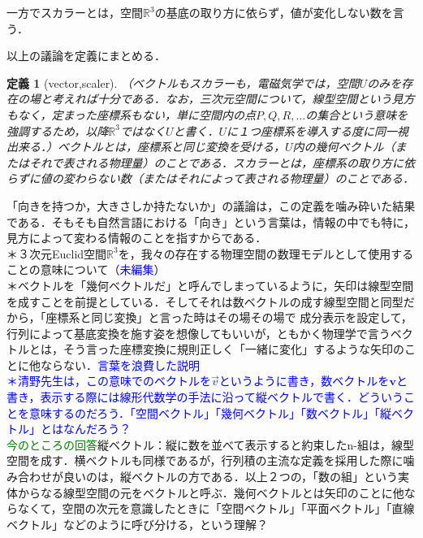 \documentclass[uplatex, 12pt, a4paper]{jsarticle}
\newtheorem{definition}{定義}
\begin{document}
一方でスカラーとは，空間$\mathbb{R}^3$の基底の取り方に依らず，値が変化しない数を言う．

以上の議論を定義にまとめる．\\
\begin{shadebox}
\begin{definition}[vector,scaler] \label{vector,scaler}
    （ベクトルもスカラーも，電磁気学では，空間$U$のみを存在の場と考えれば十分である．なお，三次元空間について，線型空間という見方もなく，定まった座標系もない，単に空間内の点$P,Q,R,\ldots$の集合という意味を強調するため，以降$\mathbb{R}^3$ではなく$U$と書く．$U$に１つ座標系を導入する度に同一視出来る．）ベクトルとは，座標系と同じ変換を受ける，$U$内の幾何ベクトル（またはそれで表される物理量）のことである．スカラーとは，座標系の取り方に依らずに値の変わらない数（またはそれによって表される物理量）のことである．
\end{definition}\end{shadebox}
「向きを持つか，大きさしか持たないか」の議論は，この定義を噛み砕いた結果である．そもそも自然言語における「向き」という言葉は，情報の中でも特に，見方によって変わる情報のことを指すからである．\\

\noindent
＊３次元Euclid空間$\mathbb{R}^3$を，我々の存在する物理空間の数理モデルとして使用することの意味について（\textcolor{blue}{未編集}）\\
＊ベクトルを「幾何ベクトルだ」と呼んでしまっているように，矢印は線型空間を成すことを前提としている．そしてそれは数ベクトルの成す線型空間と同型だから，「座標系と同じ変換」と言った時はその場その場で
成分表示を設定して，行列によって基底変換を施す姿を想像してもいいが，ともかく物理学で言うベクトルとは，そう言った座標変換に規則正しく「一緒に変化」するような矢印のことに他ならない．\textcolor{blue}{言葉を浪費した説明}\\
\textcolor{blue}{＊清野先生は，この意味でのベクトルを$\vec{v}$というように書き，数ベクトルを$\mathbf{v}$と書き，表示する際には線形代数学の手法に沿って縦ベクトルで書く．どういうことを意味するのだろう．「空間ベクトル」「幾何ベクトル」「数ベクトル」「縦ベクトル」とはなんだろう？}\\
\textcolor{green}{今のところの回答}縦ベクトル：縦に数を並べて表示すると約束したn-組は，線型空間を成す．横ベクトルも同様であるが，行列積の主流な定義を採用した際に噛み合わせが良いのは，縦ベクトルの方である．以上２つの，「数の組」という実体からなる線型空間の元をベクトルと呼ぶ．幾何ベクトルとは矢印のことに他ならなくて，空間の次元を意識したときに「空間ベクトル」「平面ベクトル」「直線ベクトル」などのように呼び分ける，という理解？
\end{document}
